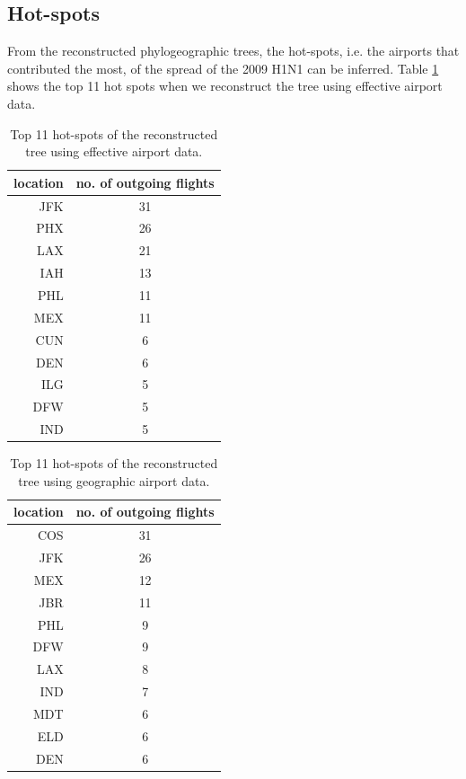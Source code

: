 \documentclass{article}
\begin{document}
\subsection{Hot-spots}
From the reconstructed phylogeographic trees, the hot-spots, i.e. the airports that contributed the most, of the spread of the 2009 H1N1 can be inferred. Table \ref{tab: hotspots airport effective} shows the top 11  hot spots when we reconstruct the tree using effective airport data. 
\begin{table}[h!]
\centering
\begin{tabular}{r|c}
location & no. of outgoing flights \\
\hline
JFK      & 31                      \\
PHX      & 26                      \\
LAX      & 21                      \\
IAH      & 13                      \\
PHL      & 11                      \\
MEX      & 11                      \\
CUN      & 6                       \\
DEN      & 6                       \\
ILG      & 5                       \\
DFW      & 5                       \\
IND      & 5                                   
\end{tabular}
\caption{Top 11 hot-spots of the reconstructed tree using effective airport data.}
\label{tab: hotspots airport effective}
\end{table}

\begin{table}[h!]
\centering
\begin{tabular}{r|c}
location & no. of outgoing flights \\
\hline
COS      & 31                      \\
JFK      & 26                      \\
MEX      & 12                      \\
JBR      & 11                      \\
PHL      & 9                       \\
DFW      & 9                       \\
LAX      & 8                       \\
IND      & 7                       \\
MDT      & 6                       \\
ELD      & 6                       \\
DEN      & 6                                  
\end{tabular}
\caption{Top 11 hot-spots of the reconstructed tree using geographic airport data.}
\label{tab: hotspots airport geographic}
\end{table}
\end{document}

